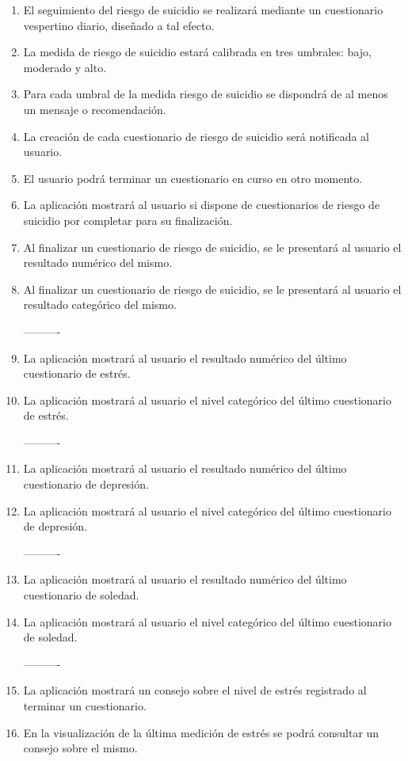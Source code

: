 \begin{enumerate}[label=\textbf{\texttt{RF-\arabic*}}]
            ----------
            \item El seguimiento del riesgo de suicidio se realizará mediante un cuestionario vespertino diario, diseñado a tal efecto.
            \item La medida de riesgo de suicidio estará calibrada en tres umbrales: bajo, moderado y alto.
            \item Para cada umbral de la medida riesgo de suicidio se dispondrá de al menos un mensaje o recomendación.
            \item La creación de cada cuestionario de riesgo de suicidio será notificada al usuario.
            \item El usuario podrá terminar un cuestionario en curso en otro momento.
            \item La aplicación mostrará al usuario si dispone de cuestionarios de riesgo de suicidio por completar para su finalización.
            \item Al finalizar un cuestionario de riesgo de suicidio, se le presentará al usuario el resultado numérico del mismo.
            \item Al finalizar un cuestionario de riesgo de suicidio, se le presentará al usuario el resultado categórico del mismo.
            
            ----------
            \item La aplicación mostrará al usuario el resultado numérico del último cuestionario de estrés.
            \item La aplicación mostrará al usuario el nivel categórico del último cuestionario de estrés.
           
            ----------
            \item La aplicación mostrará al usuario el resultado numérico del último cuestionario de depresión.
            \item La aplicación mostrará al usuario el nivel categórico del último cuestionario de depresión.
            
            ----------
            \item La aplicación mostrará al usuario el resultado numérico del último cuestionario de soledad.
            \item La aplicación mostrará al usuario el nivel categórico del último cuestionario de soledad.
            
            ----------
            \item La aplicación mostrará un consejo sobre el nivel de estrés registrado al terminar un cuestionario.
            \item En la visualización de la última medición de estrés se podrá consultar un consejo sobre el mismo. 
            

\end{enumerate}
